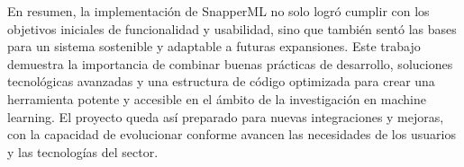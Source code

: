\vspace{2.5mm}

En resumen, la implementación de SnapperML no solo logró cumplir con los objetivos iniciales de funcionalidad y usabilidad, sino que también sentó las bases para un sistema sostenible y adaptable a futuras expansiones. Este trabajo demuestra la importancia de combinar buenas prácticas de desarrollo, soluciones tecnológicas avanzadas y una estructura de código optimizada para crear una herramienta potente y accesible en el ámbito de la investigación en machine learning. El proyecto queda así preparado para nuevas integraciones y mejoras, con la capacidad de evolucionar conforme avancen las necesidades de los usuarios y las tecnologías del sector.